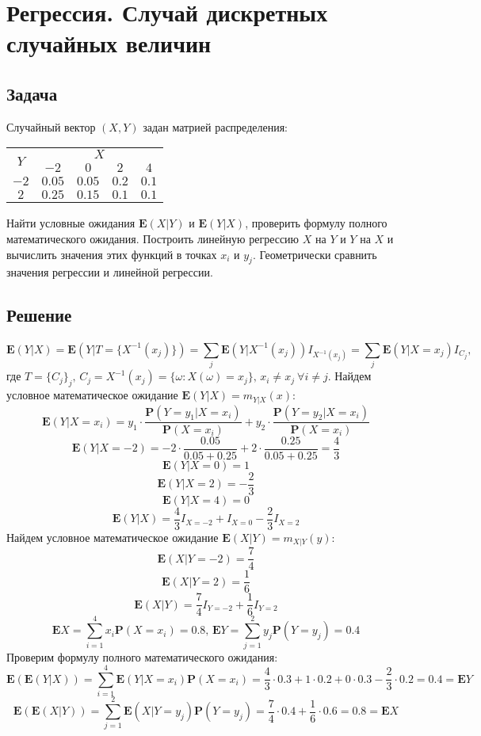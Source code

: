 \documentclass[fleqn, 10pt]{article}
\begin{document}
\section{Регрессия. Случай дискретных случайных величин}
\subsection{Задача}
Случайный вектор \((X,Y)\) задан матрией распределения:
\begin{center}
\begin{tabular}{
    | c | c | c | c | c | }
  \hline
  \multirow{2}{1em}{\(Y\)} & \multicolumn{4}{|c|}{\(X\)} \\
  \cline{2-5}
  & \(-2\) & \(0\) & \(2\) & \(4\) \\
  \hline
  \(-2\) & \(0.05\) & \(0.05\) & \(0.2\) & \(0.1\) \\
  \hline
  \(2\) & \(0.25\) & \(0.15\) & \(0.1\) & \(0.1\) \\
  \hline
\end{tabular}
\end{center}
Найти условные ожидания \(\textbf{E}(X|Y)\) и \(\textbf{E}(Y|X)\), проверить формулу полного математического ожидания. Построить линейную регрессию \(X\) на \(Y\) и \(Y\) на \(X\) и вычислить значения этих функций в точках \(x_i\) и \(y_j\). Геометрически сравнить значения регрессии и линейной регрессии.
\subsection{Решение}
\[\textbf{E}(Y|X) = \textbf{E}(Y|T=\{X^{-1}(x_j)\}) = \sum\limits_j^{}\textbf{E}(Y|X^{-1}(x_j))I_{X^{-1}(x_j)} = \sum\limits_j^{}\textbf{E}(Y|X=x_j)I_{C_j}\text{,}\]
где \(T = \{C_j\}_j \text{, } C_j = X^{-1}(x_j) = \{\omega : X(\omega) = x_j\} \text{, } x_i \ne x_j \ \forall i \ne j\).
Найдем условное математическое ожидание \(\textbf{E}(Y|X) = m_{Y|X}(x)\):
\[\textbf{E}(Y|X=x_i) = y_1\cdot\frac{\textbf{P}(Y=y_1|X=x_i)}{\textbf{P}(X=x_i)} + y_2 \cdot\frac{\textbf{P}(Y=y_2|X=x_i)}{\textbf{P}(X=x_i)}\]
\[\textbf{E}(Y|X=-2) = -2\cdot\frac{0.05}{0.05+0.25} + 2\cdot\frac{0.25}{0.05+0.25} = \frac{4}{3}\]
\[\textbf{E}(Y|X=0) = 1\]
\[\textbf{E}(Y|X=2) = -\frac{2}{3}\]
\[\textbf{E}(Y|X=4) = 0\]
\[\textbf{E}(Y|X) = \frac{4}{3}I_{X=-2}+I_{X=0}-\frac{2}{3}I_{X=2}\]
Найдем условное математическое ожидание \(\textbf{E}(X|Y)=m_{X|Y}(y)\):
\[\textbf{E}(X|Y=-2) = \frac{7}{4}\]
\[\textbf{E}(X|Y=2) = \frac{1}{6}\]
\[\textbf{E}(X|Y) = \frac{7}{4}I_{Y=-2}+\frac{1}{6}I_{Y=2}\]
\[\textbf{E}X = \sum\limits_{i=1}^4{x_i\textbf{P}(X=x_i)} = 0.8\text{, }\textbf{E}Y = \sum\limits_{j=1}^2{y_j\textbf{P}(Y=y_j)} = 0.4\]
Проверим формулу полного математического ожидания:
\[\textbf{E}(\textbf{E}(Y|X)) = \sum\limits_{i=1}^{4}{\textbf{E}(Y|X=x_i)\textbf{P}(X=x_i)} = \frac{4}{3}\cdot0.3+1\cdot0.2+0\cdot0.3-\frac{2}{3}\cdot0.2 = 0.4 = \textbf{E}Y\]
\[\textbf{E}(\textbf{E}(X|Y)) = \sum\limits_{j=1}^{2}{\textbf{E}(X|Y=y_j)\textbf{P}(Y=y_j)} = \frac{7}{4}\cdot0.4 + \frac{1}{6}\cdot0.6 = 0.8 = \textbf{E}X\]
\end{document}
